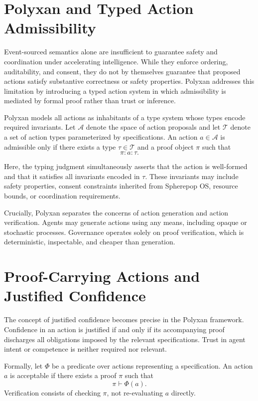 \documentclass[11pt,oneside]{article}
\begin{document}
\section{Polyxan and Typed Action Admissibility}

Event-sourced semantics alone are insufficient to guarantee safety and coordination under accelerating intelligence. While they enforce ordering, auditability, and consent, they do not by themselves guarantee that proposed actions satisfy substantive correctness or safety properties. Polyxan addresses this limitation by introducing a typed action system in which admissibility is mediated by formal proof rather than trust or inference.

Polyxan models all actions as inhabitants of a type system whose types encode required invariants. Let \( \mathcal{A} \) denote the space of action proposals and let \( \mathcal{T} \) denote a set of action types parameterized by specifications. An action \( a \in \mathcal{A} \) is admissible only if there exists a type \( \tau \in \mathcal{T} \) and a proof object \( \pi \) such that
\[
\pi : a : \tau.
\]

Here, the typing judgment simultaneously asserts that the action is well-formed and that it satisfies all invariants encoded in \( \tau \). These invariants may include safety properties, consent constraints inherited from Spherepop OS, resource bounds, or coordination requirements.

Crucially, Polyxan separates the concerns of action generation and action verification. Agents may generate actions using any means, including opaque or stochastic processes. Governance operates solely on proof verification, which is deterministic, inspectable, and cheaper than generation.

\section{Proof-Carrying Actions and Justified Confidence}

The concept of justified confidence becomes precise in the Polyxan framework. Confidence in an action is justified if and only if its accompanying proof discharges all obligations imposed by the relevant specifications. Trust in agent intent or competence is neither required nor relevant.

Formally, let \( \Phi \) be a predicate over actions representing a specification. An action \( a \) is acceptable if there exists a proof \( \pi \) such that
\[
\pi \vdash \Phi(a).
\]
Verification consists of checking \( \pi \), not re-evaluating \( a \) directly.
\end{document}
